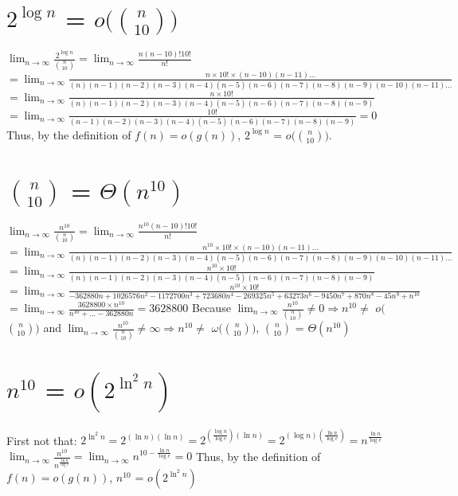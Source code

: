 \documentclass[12pt]{article}
\begin{document}
\section{$2^{\log n}$ = $o($$n \choose {10}$$)$}
$\lim_{n\to\infty} \frac{2^{\log n}}{{n \choose {10}}} = \lim_{n\to\infty} \frac{n (n-10)! 10!}{n!}$
\newline
$ = \lim_{n\to\infty} \frac{n \times 10! \times (n-10)(n-11)...}{ (n)(n-1)(n-2)(n-3)(n-4)(n-5)(n-6)(n-7)(n-8)(n-9)(n-10)(n-11)...}$
\newline
$ = \lim_{n\to\infty} \frac{n \times 10!}{(n)(n-1)(n-2)(n-3)(n-4)(n-5)(n-6)(n-7)(n-8)(n-9)}$
\newline
$= \lim_{n\to\infty} \frac{10!}{(n-1)(n-2)(n-3)(n-4)(n-5)(n-6)(n-7)(n-8)(n-9)} = 0$
\newline
Thus, by the definition of $f(n) = o(g(n))$, $2^{\log n}$ = $o($$n \choose {10}$$)$.
\section{$n \choose {10}$ = $\Theta(n^{10})$}
$\lim_{n\to\infty} \frac{n^{10}}{{n \choose {10}}} = \lim_{n\to\infty} \frac{n^{10} (n-10)! 10!}{n!}$
\newline
$ = \lim_{n\to\infty} \frac{n^{10} \times 10! \times (n-10)(n-11)...}{ (n)(n-1)(n-2)(n-3)(n-4)(n-5)(n-6)(n-7)(n-8)(n-9)(n-10)(n-11)...}$
\newline
$ = \lim_{n\to\infty} \frac{n^{10} \times 10!}{(n)(n-1)(n-2)(n-3)(n-4)(n-5)(n-6)(n-7)(n-8)(n-9)}$
\newline
$= \lim_{n\to\infty} \frac{n^{10} \times 10!}{-362880 n + 1026576 n^2 - 1172700 n^3 + 723680 n^4 - 269325 n^5 + 
 63273 n^6 - 9450 n^7 + 870 n^8 - 45 n^9 + n^{10}}$
\newline
$= \lim_{n\to\infty} \frac{3628800 \times n^{10}}{n^{10} + ... - 362880 n} = 3628800$
\newline
\newline
Because $\lim_{n\to\infty} \frac{n^{10}}{{n \choose {10}}} \neq 0 \Rightarrow n^{10} \neq $ $o($$n \choose {10}$$)$
\newline
and $\lim_{n\to\infty} \frac{n^{10}}{{n \choose {10}}} \neq \infty \Rightarrow n^{10} \neq $ $\omega($$n \choose {10}$$)$,
\newline
${n \choose {10}}$ = $\Theta(n^{10})$
\section{$n^{10}$ = $o(2^{\ln^2 n})$}
First not that: $2^{\ln^2 n} = 2^{(\ln n)(\ln n)} = 2^{(\frac{\log n}{\log e})(\ln n)} = 2^{(\log n)(\frac{\ln n}{\log e})} = n^{\frac{\ln n}{\log e}}$
\newline
$\lim_{n\to\infty} \frac{n^{10}}{n^{\frac{\ln n}{\log e}}} = \lim_{n\to\infty} n^{10 - \frac{\ln n}{\log e}} = 0$
\newline
Thus, by the definition of $f(n) = o(g(n))$, $n^{10}$ = $o(2^{\ln^2 n})$
\end{document}
